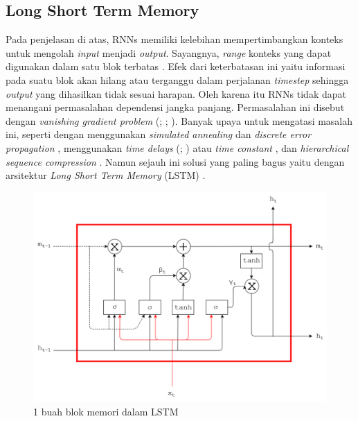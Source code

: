 \subsection{Long Short Term Memory}\label{subbab:lstm}
Pada penjelasan di atas, RNNs memiliki kelebihan mempertimbangkan konteks untuk mengolah \textit{input} menjadi \textit{output}. Sayangnya, \textit{range} konteks yang dapat digunakan dalam satu blok terbatas \citep{graves2012neural}. Efek dari keterbatasan ini yaitu informasi pada suatu blok akan hilang atau terganggu dalam perjalanan \textit{timestep} sehingga \textit{output} yang dihasilkan tidak sesuai harapan. Oleh karena itu RNNs tidak dapat menangani permasalahan dependensi jangka panjang. Permasalahan ini disebut dengan \textit{vanishing gradient problem} (\cite{hochreiter1991untersuchungen}; \cite{hochreiter2001gradient}; \cite{bengio1994learning}). Banyak upaya untuk mengatasi masalah ini, seperti dengan menggunakan \textit{simulated annealing} dan \textit{discrete error propagation} \citep{bengio1994learning}, menggunakan \textit{time delays} (\cite{lang1990time}; \cite{bakker2001reinforcement}) atau \textit{time constant} \citep{ieee1997advances}, dan \textit{hierarchical sequence compression} \citep{schmidhuber2007training}. Namun sejauh ini solusi yang paling bagus yaitu dengan arsitektur \textit{Long Short Term Memory} (LSTM) \citep{hochreiter1997long}.

\begin{figure}
	\centering
	\includegraphics[width=1.0\linewidth]{images/lstm}
	\caption{1 buah blok memori dalam LSTM}
	\label{fig:lstm}
\end{figure}

